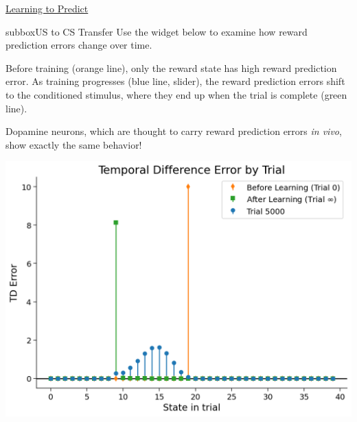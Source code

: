 \begin{textbox}{\href{https://compneuro.neuromatch.io/tutorials/W3D4_ReinforcementLearning/student/W3D4_Tutorial1.html}{Learning to Predict } }
\begin{subbox}{subbox}{US to CS Transfer }
Use the widget below to examine how reward prediction errors change over time. 


Before training (orange line), only the reward state has high reward prediction error. As training progresses (blue line, slider), the reward prediction errors shift to the conditioned stimulus, where they end up when the trial is complete (green line). 

Dopamine neurons, which are thought to carry reward prediction errors \textit{in vivo}, show exactly the same behavior!
\begin{center}
    
\includegraphics[scale=0.15]{Figures/RL/RL_Figure2.png}
\end{center}

\end{subbox}
\end{textbox}
